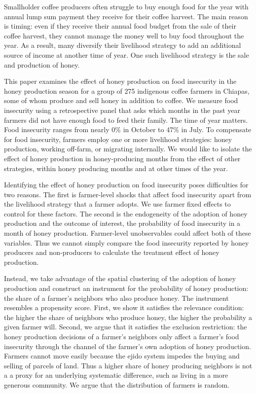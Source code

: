 \documentclass[../main.tex]{subfiles}
\begin{document}
Smallholder coffee producers often struggle to buy enough food for the year with annual lump sum payment they receive for their coffee harvest. The main reason is timing: even if they receive their annual food budget from the sale of their coffee harvest, they cannot manage the money well to buy food throughout the year.  As a result, many diversify their livelihood strategy to add an additional source of income at another time of year. One such livelihood strategy is the sale and production of honey.

This paper examines the effect of honey production on food insecurity in the honey production season for a group of 275 indigenous coffee farmers in Chiapas, some of whom produce and sell honey in addition to coffee. We measure food insecurity using a retrospective panel that asks which months in the past year farmers did not have enough food to feed their family.  The time of year matters. Food insecurity ranges from nearly 0\% in October to 47\% in July. To compensate for food insecurity, farmers employ one or more livelihood strategies: honey production, working off-farm, or migrating internally.  We would like to isolate the effect of honey production in honey-producing months from the effect of other strategies, within honey producing months and at other times of the year. 

Identifying the effect of honey production on food insecurity poses difficulties for two reasons. The first is farmer-level shocks that affect food insecurity apart from the livelihood strategy that a farmer adopts. We use farmer fixed effects to control for these factors. The second is the endogeneity of the adoption of honey production and the outcome of interest, the probability of food insecurity in a month of honey production. Farmer-level unobservables could affect both of these variables. Thus we cannot simply compare the food insecurity reported by honey producers and non-producers to calculate the treatment effect of honey production. 

Instead, we take advantage of the spatial clustering of the adoption of honey production and construct an instrument for the probability of honey production: the share of a farmer's neighbors who also produce honey. The instrument resembles a propensity score. First, we show it satisfies the relevance condition: the higher the share of neighbors who produce honey, the higher the probability a given farmer will. Second, we argue that it satisfies the exclusion restriction: the honey production decisions of a farmer's neighbors only affect a farmer's food insecurity through the channel of the farmer's own adoption of honey production. Farmers cannot move easily because the ejido system impedes the buying and selling of parcels of land. Thus a higher share of honey producing neighbors is not a a proxy for an underlying systematic difference, such as living in a more generous community. We argue that the  distribution of farmers is random. 
\end{document}
